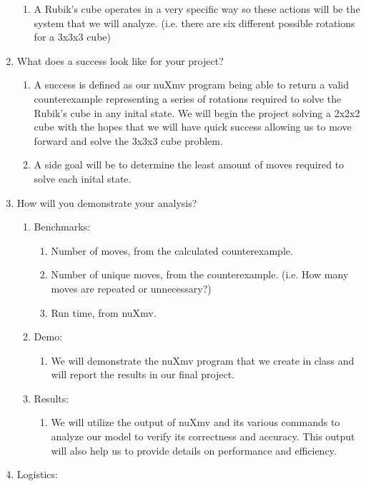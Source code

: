 \documentclass{elsarticle} %
\begin{document}
\begin{enumerate}
	\begin{enumerate}
	\item A Rubik's cube operates in a very specific way so these actions will be the system that we will analyze. (i.e. there are six different possible rotations for a 3x3x3 cube)
	\end{enumerate}
\item What does a success look like for your project?
	\begin{enumerate}
	\item A success is defined as our nuXmv program being able to return a valid counterexample representing a series of rotations required to solve the Rubik's cube in any inital state. We will begin the project solving a 2x2x2 cube with the hopes that we will have quick success allowing us to move forward and solve the 3x3x3 cube problem.
	\item A side goal will be to determine the least amount of moves required to solve each inital state.
	\end{enumerate}
\item How will you demonstrate your analysis?
	\begin{enumerate}
	\item Benchmarks:
		\begin{enumerate}
		\item Number of moves, from the calculated counterexample.
		\item Number of unique moves, from the counterexample. (i.e. How many moves are repeated or unnecessary?)
		\item Run time, from nuXmv.
		\end{enumerate}
	\item Demo:
		\begin{enumerate}
		\item We will demonstrate the nuXmv program that we create in class and will report the results in our final project.
		\end{enumerate}
	\item Results:
		\begin{enumerate}
		\item We will utilize the output of nuXmv and its various commands to analyze our model to verify its correctness and accuracy. This output will also help us to provide details on performance and efficiency.
		\end{enumerate}
	\end{enumerate}
\item Logistics:
	\begin{enumerate}

\end{enumerate}
\end{enumerate}
\end{document}
